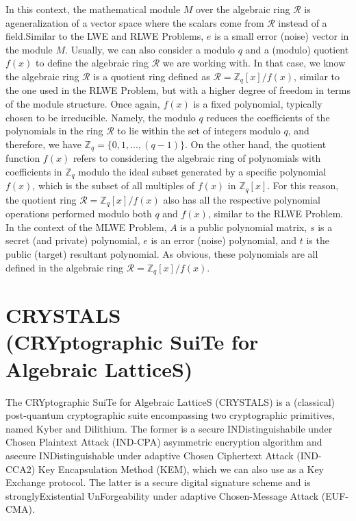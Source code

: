 \documentclass[runningheads]{llncs}
\numberwithin{equation}{section}
\begin{document}
    \noindent In this context, the mathematical module $M$ over the algebraic ring $\mathcal{R}$ is a\break generalization of a vector space where the scalars come from $\mathcal{R}$ instead of a field.\break\clearpage\noindent Similar to the LWE and RLWE Problems, $e$ is a small error (noise) vector in the module $M$. Usually, we can also consider a modulo $q$ and a (modulo) quotient $f(x)$ to define the algebraic ring $\mathcal{R}$ we are working with. In that case, we know the algebraic ring $\mathcal{R}$ is a quotient ring defined as $\mathcal{R} = {\mathbb{Z}}_{q}[x]/f(x)$, similar to the one used in the RLWE Problem, but with a higher degree of freedom in terms of the module structure. Once again, $f(x)$ is a fixed polynomial, typically chosen to be irreducible. Namely, the modulo $q$ reduces the coefficients of the polynomials in the ring $\mathcal{R}$ to lie within the set of integers modulo $q$, and therefore, we have ${\mathbb{Z}}_{q} = \{0, 1, ..., (q - 1)\}$. On the other hand, the quotient function $f(x)$ refers to considering the algebraic ring of polynomials with coefficients in ${\mathbb{Z}}_{q}$ modulo the ideal subset generated by a specific polynomial $f(x)$, which is the subset of all multiples of $f(x)$ in ${\mathbb{Z}}_{q}[x]$. For this reason, the quotient ring $\mathcal{R} = {\mathbb{Z}}_{q}[x]/f(x)$ also has all the respective polynomial operations performed modulo both $q$ and $f(x)$, similar to the RLWE Problem. In the context of the MLWE Problem, $A$ is a public polynomial matrix, $s$ is a secret (and private) polynomial, $e$ is an error (noise) polynomial, and $t$ is the public (target) resultant polynomial. As obvious, these polynomials are all defined in the algebraic ring $\mathcal{R} = {\mathbb{Z}}_{q}[x]/f(x)$.
    

    \vspace{-2ex}
    \section{CRYSTALS\\(CRYptographic SuiTe for Algebraic LatticeS)}
    \label{sec:crystals-cryptographic-suite-for-algebraic-lattices}

    The CRYptographic SuiTe for Algebraic LatticeS (CRYSTALS) is a (classical) post-quantum cryptographic suite encompassing two cryptographic primitives, named Kyber and Dilithium. The former is a secure INDistinguishabile under Chosen Plaintext Attack (IND-CPA) asymmetric encryption algorithm and a\break secure INDistinguishable under adaptive Chosen Ciphertext Attack (IND-CCA2) Key Encapsulation Method (KEM), which we can also use as a Key Exchange protocol. The latter is a secure digital signature scheme and is strongly\break Existential UnForgeability under adaptive Chosen-Message Attack (EUF-CMA).
    
\end{document}
